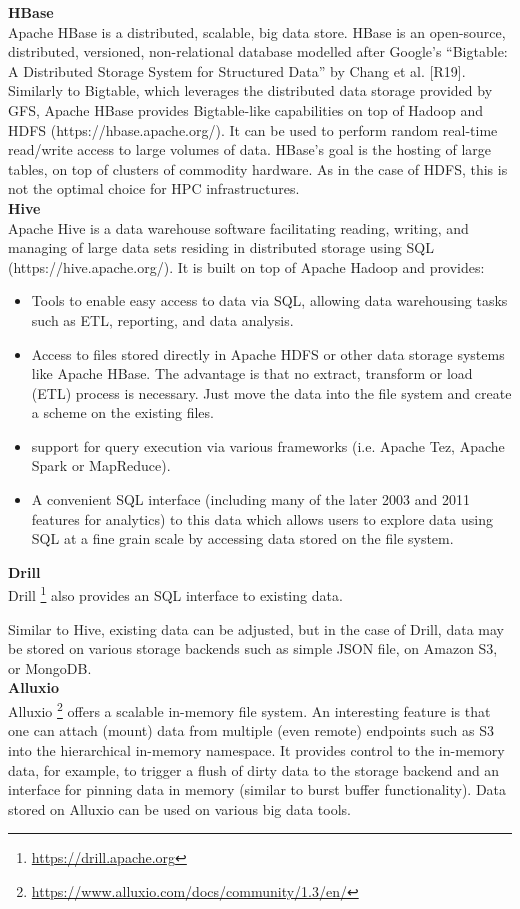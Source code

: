 \textbf{HBase}\\
Apache HBase is a distributed, scalable, big data store.
HBase is an open-source, distributed, versioned, non-relational database modelled after Google's ``Bigtable: A Distributed Storage System for Structured Data'' by Chang et al. [R19]. Similarly to Bigtable, which leverages the distributed data storage provided by GFS, Apache HBase provides Bigtable-like capabilities on top of Hadoop and HDFS (https://hbase.apache.org/).
It can be used to perform random real-time read/write access to large volumes of data. HBase's goal is the hosting of large tables, on top of clusters of commodity hardware. As in the case of HDFS, this is not the optimal choice for HPC infrastructures. \\

\textbf{Hive}\\
Apache Hive is a data warehouse software facilitating reading, writing, and managing of large data sets residing in distributed storage using SQL (https://hive.apache.org/). It is built on top of Apache Hadoop and provides:
\begin{itemize}
	\item Tools to enable easy access to data via SQL, allowing data warehousing tasks such as ETL, reporting, and data analysis.
	\item Access to files stored directly in Apache HDFS or other data storage systems like Apache HBase.
The advantage is that no extract, transform or load (ETL) process is necessary. Just move the data into the file system and create a scheme on the existing files.
	\item support for query execution via various frameworks (i.e. Apache Tez, Apache Spark or MapReduce).
	\item A convenient SQL interface (including many of the later 2003 and 2011 features for analytics) to this data which allows users to explore data using SQL at a fine grain scale by accessing data stored on the file system.
\end{itemize}

\textbf{Drill}\\
Drill \footnote{\url{https://drill.apache.org}} also provides an SQL interface to existing data.

Similar to Hive, existing data can be adjusted, but in the case of Drill, data may be stored on various storage backends such as simple JSON file, on Amazon S3, or MongoDB.\\

\textbf{Alluxio}\\
Alluxio \footnote{\url{https://www.alluxio.com/docs/community/1.3/en/}} offers a scalable in-memory file system.
An interesting feature is that one can attach (mount) data from multiple (even remote) endpoints such as S3 into the hierarchical in-memory namespace.
It provides control to the in-memory data, for example, to trigger a flush of dirty data to the storage backend and an interface for pinning data in memory (similar to burst buffer functionality).
Data stored on Alluxio can be used on various big data tools.

